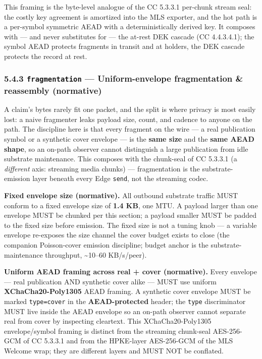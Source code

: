 \documentclass[11pt]{article}
\begin{document}
This framing is the byte-level analogue of the CC 5.3.3.1 per-chunk stream seal: the costly key agreement is amortized into the MLS exporter, and the hot path is a per-symbol symmetric AEAD with a deterministically derived key. It composes with — and never substitutes for — the at-rest DEK cascade (CC 4.4.3.4.1); the symbol AEAD protects fragments in transit and at holders, the DEK cascade protects the record at rest.


\subsubsection*{5.4.3 \texttt{fragmentation} — Uniform-envelope fragmentation \& reassembly (normative)}


A claim's bytes rarely fit one packet, and the split is where privacy is most easily lost: a naive fragmenter leaks payload size, count, and cadence to anyone on the path. The discipline here is that every fragment on the wire — a real publication symbol or a synthetic cover envelope — is the \textbf{same size} and the \textbf{same AEAD shape}, so an on-path observer cannot distinguish a large publication from idle substrate maintenance. This composes with the chunk-seal of CC 5.3.3.1 (a \textit{different} axis: streaming media chunks) — fragmentation is the substrate-emission layer beneath every Edge \texttt{send}, not the streaming codec.


\textbf{Fixed envelope size (normative).} All outbound substrate traffic MUST conform to a fixed envelope size of \textbf{1.4 KB}, one MTU. A payload larger than one envelope MUST be chunked per this section; a payload smaller MUST be padded to the fixed size before emission. The fixed size is not a tuning knob — a variable envelope re-exposes the size channel the cover budget exists to close (the companion Poisson-cover emission discipline; budget anchor is the substrate-maintenance throughput, \textasciitilde{}10–60 KB/s/peer).


\textbf{Uniform AEAD framing across real + cover (normative).} Every envelope — real publication AND synthetic cover alike — MUST use uniform \textbf{XChaCha20-Poly1305} AEAD framing. A synthetic cover envelope MUST be marked \texttt{type=cover} in the \textbf{AEAD-protected} header; the \texttt{type} discriminator MUST live inside the AEAD envelope so an on-path observer cannot separate real from cover by inspecting cleartext. This XChaCha20-Poly1305 envelope/symbol framing is distinct from the streaming chunk-seal AES-256-GCM of CC 5.3.3.1 and from the HPKE-layer AES-256-GCM of the MLS Welcome wrap; they are different layers and MUST NOT be conflated.
\end{document}
